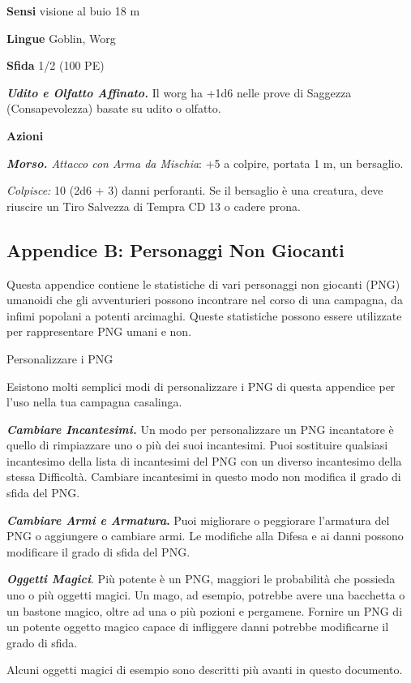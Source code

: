 \begin{multicols}{2}
\textbf{Sensi} visione al buio 18 m

\textbf{Lingue} Goblin, Worg

\textbf{Sfida} 1/2 (100 PE)

\emph{\textbf{Udito e Olfatto Affinato.}} Il worg ha +1d6 nelle prove di Saggezza (Consapevolezza) basate su udito o olfatto.

\textbf{Azioni}

\emph{\textbf{Morso.} Attacco con Arma da Mischia}: +5 a colpire, portata 1 m, un bersaglio.

\emph{Colpisce:} 10 (2d6 + 3) danni perforanti. Se il bersaglio è una creatura, deve riuscire un Tiro Salvezza di Tempra CD 13 o cadere prona.

\subsection{Appendice B: Personaggi Non Giocanti}

Questa appendice contiene le statistiche di vari personaggi non giocanti (PNG) umanoidi che gli avventurieri possono incontrare nel corso di una campagna, da infimi popolani a potenti arcimaghi. Queste statistiche possono essere utilizzate per rappresentare PNG umani e non.

Personalizzare i PNG

Esistono molti semplici modi di personalizzare i PNG di questa appendice per l'uso nella tua campagna casalinga.

\emph{\textbf{Cambiare Incantesimi.}} Un modo per personalizzare un PNG incantatore è quello di rimpiazzare uno o più dei suoi incantesimi. Puoi sostituire qualsiasi incantesimo della lista di
incantesimi del PNG con un diverso incantesimo della stessa Difficoltà. Cambiare incantesimi in questo modo non modifica il grado di sfida del PNG.

\textbf{\emph{Cambiare Armi e Armatura}.} Puoi migliorare o peggiorare l'armatura del PNG o aggiungere o cambiare armi. Le modifiche alla Difesa e ai danni possono modificare il grado di sfida del PNG.

\emph{\textbf{Oggetti Magici}}. Più potente è un PNG, maggiori le probabilità che possieda uno o più
oggetti magici. Un mago, ad esempio, potrebbe avere una bacchetta o un bastone magico, oltre ad una o più pozioni e pergamene. Fornire un PNG di un potente oggetto magico capace di infliggere danni potrebbe modificarne il grado di sfida.

Alcuni oggetti magici di esempio sono descritti più avanti in questo documento.


\end{multicols}
